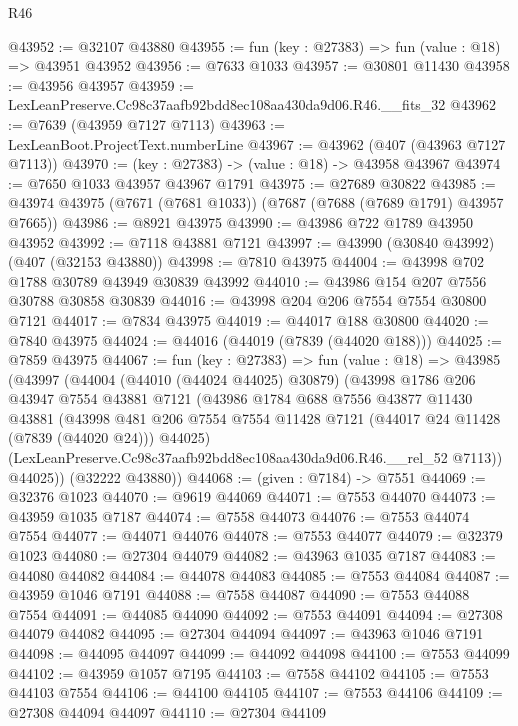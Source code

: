 \begin{lexlean}{R46}
\begin{coremodule}
@43952 := @32107 @43880
@43955 := fun (key : @27383) => fun (value : @18) => @43951 @43952
@43956 := @7633 @1033
@43957 := @30801 @11430
@43958 := @43956 @43957
@43959 := LexLeanPreserve.Cc98c37aafb92bdd8ec108aa430da9d06.R46.__fits_32
@43962 := @7639 (@43959 @7127 @7113)
@43963 := LexLeanBoot.ProjectText.numberLine
@43967 := @43962 (@407 (@43963 @7127 @7113))
@43970 := (key : @27383) -> (value : @18) -> @43958 @43967
@43974 := @7650 @1033 @43957 @43967 @1791
@43975 := @27689 @30822
@43985 := @43974 @43975 (@7671 (@7681 @1033)) (@7687 (@7688 (@7689 @1791) @43957 @7665))
@43986 := @8921 @43975
@43990 := @43986 @722 @1789 @43950 @43952
@43992 := @7118 @43881 @7121
@43997 := @43990 (@30840 @43992) (@407 (@32153 @43880))
@43998 := @7810 @43975
@44004 := @43998 @702 @1788 @30789 @43949 @30839 @43992
@44010 := @43986 @154 @207 @7556 @30788 @30858 @30839
@44016 := @43998 @204 @206 @7554 @7554 @30800 @7121
@44017 := @7834 @43975
@44019 := @44017 @188 @30800
@44020 := @7840 @43975
@44024 := @44016 (@44019 (@7839 (@44020 @188)))
@44025 := @7859 @43975
@44067 := fun (key : @27383) =>
  fun (value : @18) =>
  @43985
    (@43997
      (@44004
        (@44010 (@44024 @44025) @30879)
        (@43998
          @1786
          @206
          @43947
          @7554
          @43881
          @7121
          (@43986
            @1784
            @688
            @7556
            @43877
            @11430
            @43881
            (@43998
              @481
              @206
              @7554
              @7554
              @11428
              @7121
              (@44017 @24 @11428 (@7839 (@44020 @24)))
              @44025)
            (LexLeanPreserve.Cc98c37aafb92bdd8ec108aa430da9d06.R46.__rel_52 @7113))
          @44025))
      (@32222 @43880))
@44068 := (given : @7184) -> @7551
@44069 := @32376 @1023
@44070 := @9619 @44069
@44071 := @7553 @44070
@44073 := @43959 @1035 @7187
@44074 := @7558 @44073
@44076 := @7553 @44074 @7554
@44077 := @44071 @44076
@44078 := @7553 @44077
@44079 := @32379 @1023
@44080 := @27304 @44079
@44082 := @43963 @1035 @7187
@44083 := @44080 @44082
@44084 := @44078 @44083
@44085 := @7553 @44084
@44087 := @43959 @1046 @7191
@44088 := @7558 @44087
@44090 := @7553 @44088 @7554
@44091 := @44085 @44090
@44092 := @7553 @44091
@44094 := @27308 @44079 @44082
@44095 := @27304 @44094
@44097 := @43963 @1046 @7191
@44098 := @44095 @44097
@44099 := @44092 @44098
@44100 := @7553 @44099
@44102 := @43959 @1057 @7195
@44103 := @7558 @44102
@44105 := @7553 @44103 @7554
@44106 := @44100 @44105
@44107 := @7553 @44106
@44109 := @27308 @44094 @44097
@44110 := @27304 @44109

\end{coremodule}
\end{lexlean}
